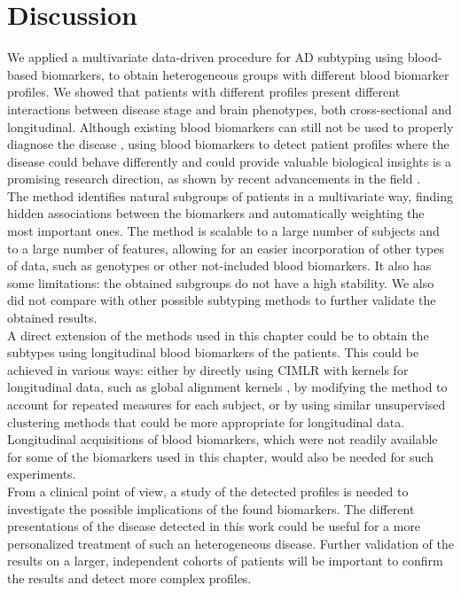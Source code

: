 \section{Discussion}
\label{conclusions}

We applied a multivariate data-driven procedure for AD subtyping using blood-based biomarkers, to obtain heterogeneous groups with different blood biomarker profiles. We showed that patients with different profiles present different interactions between disease stage and brain phenotypes, both cross-sectional and longitudinal. Although existing blood biomarkers can still not be used to properly diagnose the disease \cite{Schneider2009,Gupta2016,Lovheim2017}, using blood biomarkers to detect patient profiles where the disease could behave differently and could provide valuable biological insights is a promising research direction, as shown by recent advancements in the field \cite{Cullen2020,Moscoso2020,Karikari2020a}.  \\

The method identifies natural subgroups of patients in a multivariate way, finding hidden associations between the biomarkers and automatically weighting the most important ones. The method is scalable to a large number of subjects and to a large number of features, allowing for an easier incorporation of other types of data, such as genotypes or other not-included blood biomarkers. It also has some limitations: the obtained subgroups do not have a high stability. We also did not compare with other possible subtyping methods to further validate the obtained results. \\

A direct extension of the methods used in this chapter could be to obtain the subtypes using longitudinal blood biomarkers of the patients. This could be achieved in various ways: either by directly using CIMLR with kernels for longitudinal data, such as global alignment kernels \cite{Cuturi2011}, by modifying the method to account for repeated measures for each subject, or by using similar unsupervised clustering methods that could be more appropriate for longitudinal data. Longitudinal acquisitions of blood biomarkers, which were not readily available for some of the biomarkers used in this chapter, would also be needed for such experiments. \\

From a clinical point of view, a study of the detected profiles is needed to investigate the possible implications of the found biomarkers. The different presentations of the disease detected in this work could be useful for a more personalized treatment of such an heterogeneous disease. Further validation of the results on a larger, independent cohorts of patients will be important to confirm the results and detect more complex profiles.  \\

